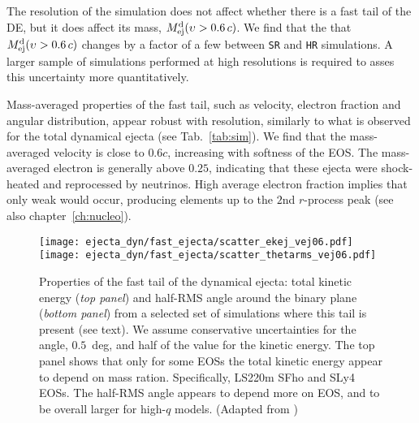 The resolution of the simulation does not affect whether there is a fast tail 
of the \ac{DE}, but it does affect its mass, $M^{\text{d}}_{\text{ej}}(\upsilon>0.6\, c)$.
We find that the that $M^{\text{d}}_{\text{ej}}(\upsilon>0.6\, c)$ changes by a factor of a few
between \texttt{SR} and \texttt{HR} simulations.
A larger sample of simulations performed at high resolutions is required to asses this uncertainty more quantitatively.


Mass-averaged properties of the fast tail, such as velocity, electron fraction and 
angular distribution, appear robust with resolution, similarly to what is observed for 
the total dynamical ejecta (see Tab.~\ref{tab:sim}).
%
We find that the mass-averaged velocity %
is close to $0.6c$,
increasing with softness of the \ac{EOS}.
%
The mass-averaged electron
is generally above $0.25$, 
indicating that these ejecta were shock-heated and reprocessed by neutrinos. High 
average electron fraction implies that only weak \rproc{} \nuc{} would 
occur, producing elements up to the $2$nd $r$-process peak \citep{Lippuner:2015gwa} 
(see also chapter~\ref{ch:nucleo}).


\begin{figure}%
    \centering 
    \texttt{[image: ejecta\_dyn/fast\_ejecta/scatter\_ekej\_vej06.pdf]}
    \texttt{[image: ejecta\_dyn/fast\_ejecta/scatter\_thetarms\_vej06.pdf]}
    \caption{
        Properties of the fast tail of the dynamical ejecta:
        total kinetic energy (\textit{top panel}) and 
        half-\ac{RMS} angle around the binary plane (\textit{bottom panel})
        from a selected set of simulations where this tail is present (see text).
        We assume conservative uncertainties for the angle, $0.5$~deg, 
        and half of the value for the kinetic energy. 
        The top panel shows that only for some \acp{EOS} the 
        total kinetic energy appear to depend on mass ration. Specifically, LS220m SFho and SLy4 \acp{EOS}.
        The half-\ac{RMS} angle appears to depend more on \ac{EOS}, and to be overall larger for high-$q$ models.
        (Adapted from \citet{Nedora:2021eoj})
    } 
    \label{fig:ejecta_v06}
\end{figure}


